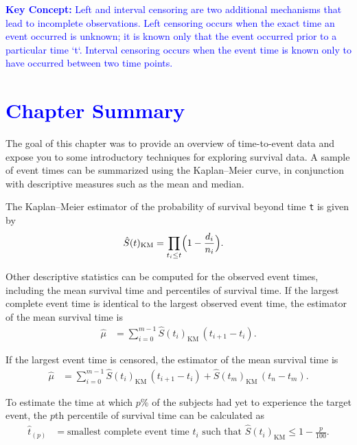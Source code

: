 \documentclass[
]{report}
\begin{document}
\textbf{\textcolor{blue}{Key Concept:}}
\textcolor{blue}{
Left and interval censoring are two additional mechanisms that lead to incomplete observations. Left censoring occurs when the exact time an event occurred is unknown; it is known only that the event occurred prior to a particular time `t`. Interval censoring occurs when the event time is known only to have occurred between two time points.}

\hypertarget{section-87}{%
\section{\texorpdfstring{\textcolor{blue}{Chapter Summary}}{}}\label{section-87}}

The goal of this chapter was to provide an overview of time-to-event data and expose you to some introductory techniques for exploring survival data. A sample of event times can be summarized using the Kaplan--Meier curve, in conjunction with descriptive measures such as the mean and median.

The Kaplan--Meier estimator of the probability of survival beyond time \texttt{t} is given by
\begin{align}
\hat S(t)_{\mathrm{KM}} &= \prod_{t_i \le t} \Bigl(1 - \frac{d_i}{n_i}\Bigr).
\end{align}

Other descriptive statistics can be computed for the observed event times, including the mean survival time and percentiles of survival time. If the largest complete event time is identical to the largest observed event time, the estimator of the mean survival time is
\begin{align}
\hat \mu &= \sum_{i=0}^{m-1} \hat S(t_i)_{\mathrm{KM}}\,(t_{i+1} - t_i).
\end{align}

If the largest event time is censored, the estimator of the mean survival time is
\begin{align}
\hat \mu &= \sum_{i=0}^{m-1} \hat S(t_i)_{\mathrm{KM}}\,(t_{i+1} - t_i)
+ \hat S(t_m)_{\mathrm{KM}}\,(t_n - t_m).
\end{align}

To estimate the time at which \(\scriptstyle p\)\% of the subjects had yet to experience the target event, the \(\scriptstyle p\)th percentile of survival time can be calculated as
\begin{align}
\hat t_{(p)} &= \text{smallest complete event time }t_i\text{ such that }
\hat S(t_i)_{\mathrm{KM}} \le 1 - \frac{p}{100}.
\end{align}
\end{document}

